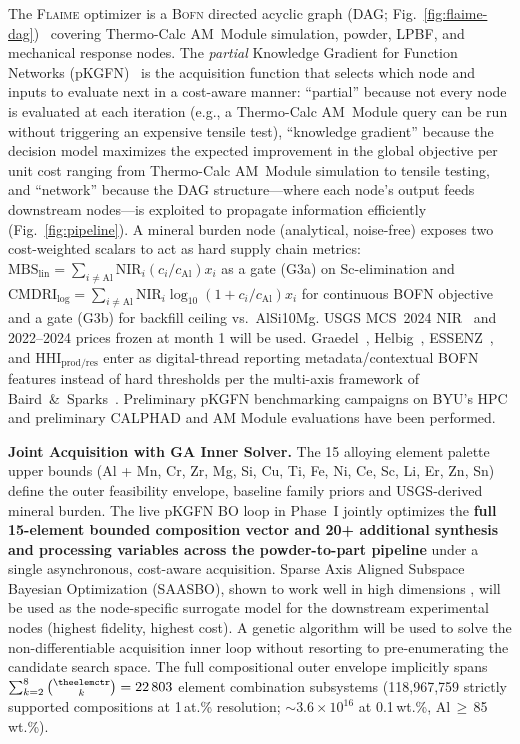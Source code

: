 \documentclass[11pt,letterpaper]{article}
\newcommand{\flaime}{\textsc{Flaime}}
\newcommand{\bofn}{\textsc{Bofn}}
\newcommand{\kmin}{2}                    %
\newcommand{\kmax}{8}                    %
\newcounter{elemctr}
\newcommand{\elementcount}{\theelemctr}  %
\newcommand{\subsystemcount}{22\,803}    %
\newcommand{\feasiblepairsOneAt}{118{,}967{,}759}
\newcommand{\feasiblepairsTenthWt}{$\sim$$3.6\times10^{16}$}
\begin{document}
The \flaime{} optimizer is a \bofn{} directed acyclic graph
(DAG; Fig.~\ref{fig:flaime-dag})~\cite{sundar_2025_s4357802,paramore_2025_jactamat} covering
Thermo-Calc AM~Module simulation, powder, LPBF, and mechanical response nodes.
The \emph{partial} Knowledge Gradient for Function
Networks (pKGFN)~\cite{buathong_2023_23110214,buathong_2025_25061145}
is the acquisition function that selects which node and inputs to
evaluate next in a cost-aware manner: ``partial'' because not every
node is evaluated at each iteration (e.g., a Thermo-Calc AM~Module
query can be run without triggering an expensive tensile test),
``knowledge gradient'' because the decision model maximizes the expected
improvement in the global objective per unit cost
ranging from Thermo-Calc AM~Module simulation to tensile testing, and
``network'' because the DAG structure---where each node's output feeds downstream nodes---is exploited to propagate information efficiently (Fig.~\ref{fig:pipeline}).
A mineral burden node (analytical, noise-free) exposes two cost-weighted
scalars to act as hard supply chain metrics: $\mathrm{MBS}_{\text{lin}}{=}\sum_{i\neq\mathrm{Al}}\mathrm{NIR}_i(c_i/c_{\mathrm{Al}})x_i$
as a gate (G3a) on Sc-elimination and $\mathrm{CMDRI}_{\text{log}}{=}\sum_{i\neq\mathrm{Al}}\mathrm{NIR}_i\log_{10}(1+c_i/c_{\mathrm{Al}})x_i$
for continuous BOFN objective and a gate (G3b) for backfill ceiling vs.\ AlSi10Mg. USGS MCS~2024 NIR~\cite{usgs_mcs_2024}
and 2022--2024 prices frozen at month 1
will be used. Graedel~\cite{graedel_2012_es203534}, Helbig~\cite{mulukutla_2024_ssrn4968},
ESSENZ~\cite{cimprich_2019_jiec1286}, and $\mathrm{HHI}_{\text{prod/res}}$
enter as digital-thread reporting metadata/contextual BOFN features instead of hard thresholds %
per the multi-axis framework of Baird~\&~Sparks~\cite{titirici_2022_roadmap}. Preliminary pKGFN benchmarking campaigns on BYU's HPC and preliminary CALPHAD and AM Module evaluations have been performed.

\textbf{Joint Acquisition with GA Inner Solver.}
The 15 alloying element palette upper bounds (Al + Mn, Cr, Zr, Mg, Si, Cu, Ti, Fe, Ni, Ce, Sc, Li, Er, Zn, Sn)
define the outer feasibility envelope, baseline family priors and USGS-derived mineral burden. The live pKGFN BO loop in
Phase~I jointly optimizes the \textbf{full 15-element bounded composition
vector and 20+ additional synthesis and processing variables across the powder-to-part pipeline} under a single asynchronous, cost-aware acquisition. Sparse Axis Aligned Subspace Bayesian Optimization (SAASBO), shown to work well in high dimensions \cite{eriksson_2021_21030034,baird_2022_commatsci}, will be used as the node-specific surrogate model for the downstream experimental nodes (highest fidelity, highest cost). A genetic algorithm will be used to solve the non-differentiable acquisition inner loop without resorting to pre-enumerating the candidate search space.
The full compositional outer envelope implicitly spans
$\sum_{k=2}^{8}\binom{\elementcount}{k}=\subsystemcount{}$
element combination subsystems (\feasiblepairsOneAt{} strictly
supported compositions at 1\,at.\% resolution; \feasiblepairsTenthWt{}
at 0.1\,wt.\%, Al\,$\geq$\,85\,wt.\%).
\end{document}
